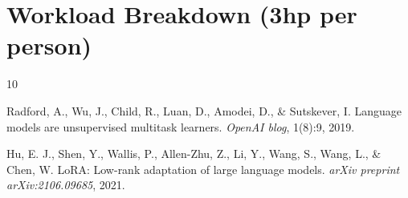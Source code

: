 \documentclass{article}
\begin{document}
\section{Workload Breakdown (3hp per person)}



\begin{thebibliography}{10}

Radford, A., Wu, J., Child, R., Luan, D., Amodei, D., \& Sutskever, I.
\newblock Language models are unsupervised multitask learners.
\newblock \emph{OpenAI blog}, 1(8):9, 2019.

Hu, E. J., Shen, Y., Wallis, P., Allen-Zhu, Z., Li, Y., Wang, S., Wang, L., \& Chen, W.
\newblock LoRA: Low-rank adaptation of large language models.
\newblock \emph{arXiv preprint arXiv:2106.09685}, 2021.

\end{thebibliography}
\end{document}
